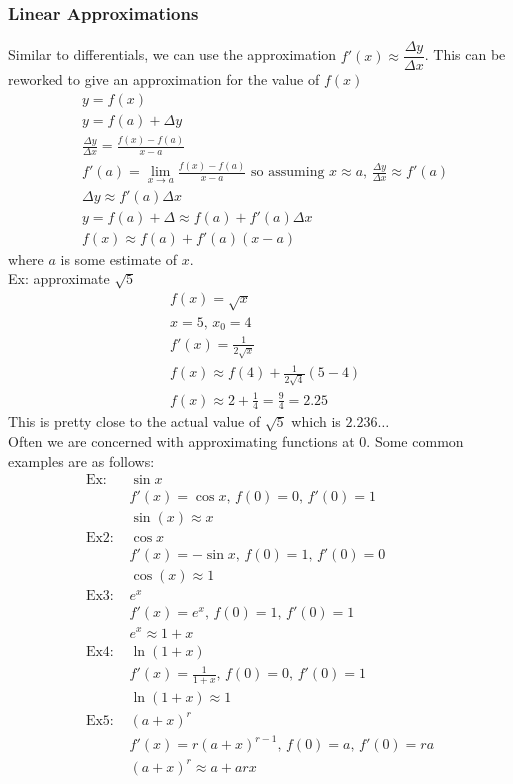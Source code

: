 \documentclass[11pt, fleqn]{article}
\begin{document}
\subsubsection{Linear Approximations}
Similar to differentials, we can use the approximation $f'(x)\approx \dfrac{\Delta y}{\Delta x}$. This can be reworked to give an approximation for the value of $f(x)$
\begin{align*}
    &y=f(x)\\
    &y=f(a)+\Delta y\\
    &\frac{\Delta y}{\Delta x}=\frac{f(x)-f(a)}{x-a}\\
    &f'(a)=\lim_{x\to a}\frac{f(x)-f(a)}{x-a}\text{ so assuming }x\approx a,\, \frac{\Delta y}{\Delta x}\approx f'(a)\\
    &\Delta y\approx f'(a)\Delta x\\
    &y=f(a)+\Delta \approx f(a)+f'(a)\Delta x\\
    &f(x)\approx f(a)+f'(a)(x-a)
\end{align*}
where $a$ is some estimate of $x$.\\
Ex: approximate $\sqrt{5}$
\begin{align*}
    &f(x)=\sqrt{x}\\
    &x=5,\,x_0=4\\
    &f'(x)=\frac{1}{2\sqrt{x}}\\
    &f(x)\approx f(4)+\frac{1}{2\sqrt{4}}(5-4)\\
    &f(x)\approx 2+\frac{1}{4}=\frac{9}{4}=2.25
\end{align*}
This is pretty close to the actual value of $\sqrt{5}$ which is $2.236\ldots$\\
Often we are concerned with approximating functions at 0. Some common examples are as follows:
\begin{align*}
    \text{Ex: }&\sin x\\
    &f'(x)=\cos x,\,f(0)=0,\,f'(0)=1\\
    &\sin(x)\approx x\\
    \text{Ex2: }&\cos x\\
    &f'(x)=-\sin x,\,f(0)=1,\,f'(0)=0\\
    &\cos(x)\approx 1\\
    \text{Ex3: }&e^x\\
    &f'(x)=e^x,\,f(0)=1,\,f'(0)=1\\
    &e^x\approx 1+x\\
    \text{Ex4: }&\ln(1+x)\\
    &f'(x)=\frac{1}{1+x},\,f(0)=0,\,f'(0)=1\\
    &\ln(1+x)\approx 1\\
    \text{Ex5: }&(a+x)^r\\
    &f'(x)=r(a+x)^{r-1},\,f(0)=a,\,f'(0)=ra\\
    &(a+x)^r\approx a+arx
\end{align*}
\end{document}
